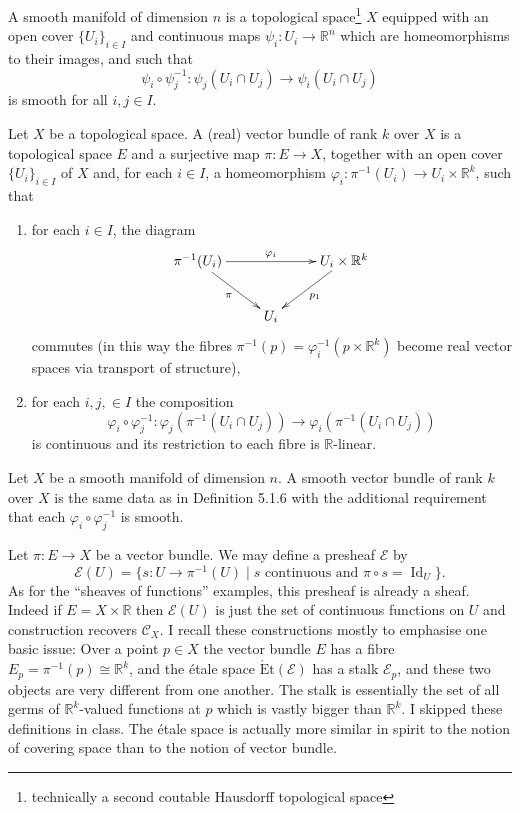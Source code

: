\begin{definition}
A smooth manifold of dimension $n$ is a topological space\footnote{technically a second coutable Hausdorff topological space} $X$ equipped
with an open cover $\{U_i\}_{i\in I}$ and continuous maps $\psi_i:U_i\to\mathbb R^n$ which are homeomorphisms to
their images, and such that
\[
\psi_i\circ\psi_j^{-1}:\psi_j(U_i\cap U_j)\to\psi_i(U_i\cap U_j)
\]
is smooth for all $i,j\in I$.
\end{definition}

\begin{definition}
Let $X$ be a topological space. A (real) vector bundle of rank $k$ over $X$ is
a topological space $E$ and a surjective map $\pi:E\to X$, together with an open cover
$\{U_i\}_{i\in I}$ of $X$ and, for each $i\in I$, a homeomorphism
$\varphi_i:\pi^{-1}(U_i)\to U_i\times\mathbb R^k$, such that
\begin{enumerate}
\item for each $i\in I$, the diagram
\[
\xymatrix{
\pi^{-1}(U_i)\ar[rr]^{\varphi_i}\ar[dr]_{\pi}&&U_i\times\mathbb R^k\ar[dl]^{p_1}\\
&U_i
}
\]
commutes (in this way the fibres
$\pi^{-1}(p)=\varphi_i^{-1}(p\times\mathbb R^k)$ become real vector spaces via
transport of structure),
\item for each $i,j,\in I$ the composition
\[
\varphi_i\circ\varphi_j^{-1}:
\varphi_j(\pi^{-1}(U_i\cap U_j))\to
\varphi_i(\pi^{-1}(U_i\cap U_j))
\]
is continuous and its restriction to each fibre is $\mathbb R$-linear.
\end{enumerate}
\end{definition}

\begin{definition}
Let $X$ be a smooth manifold of dimension $n$. A smooth vector bundle of
rank $k$ over $X$ is the same data as in Definition 5.1.6 with the additional requirement that
each $\varphi_i\circ\varphi_j^{-1}$ is smooth.
\end{definition}

Let $\pi:E\to X$ be a vector bundle. We may define a presheaf $\mathcal E$ by
\[
\mathcal E(U)=\{s:U\to\pi^{-1}(U)\mid s\text{ continuous and }\pi\circ s=\operatorname{Id}_U\}.
\]
As for the “sheaves of functions” examples, this presheaf is already a sheaf. Indeed if
$E=X\times\mathbb R$ then $\mathcal E(U)$ is just the set of continuous functions on $U$ and construction recovers
$\mathcal C_X$.
I recall these constructions mostly to emphasise one basic issue: Over a point $p\in X$ the
vector bundle $E$ has a fibre $E_p=\pi^{-1}(p)\cong\mathbb R^k$, and the étale space
$\operatorname{\acute Et}(\mathcal E)$ has a stalk $\mathcal E_p$, and
these two objects are very different from one another. The stalk is essentially the set of all
germs of $\mathbb R^k$-valued functions at $p$ which is vastly bigger than $\mathbb R^k$.
I skipped these definitions in class.
The étale space is actually more similar in spirit to the notion of covering space than to the
notion of vector bundle.

